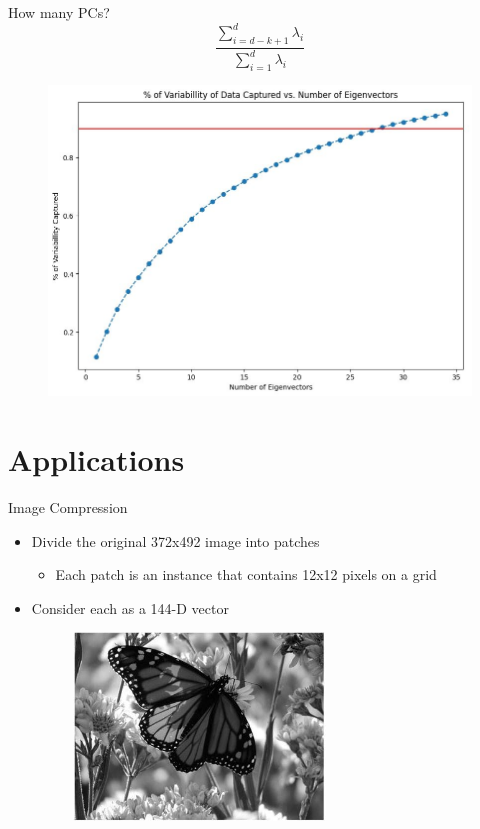 \documentclass[serif, aspectratio=169]{beamer}
\begin{document}
\begin{frame}{How many PCs?}
       $$\frac{\sum_{i=d-k+1}^{d} \lambda_i}{\sum_{i=1}^{d} \lambda_i}$$
       \begin{figure}[htpb]
            \begin{center}
                \includegraphics[keepaspectratio, scale=0.4]{pic/PCA_var.JPG}
            \end{center}
        \end{figure}
\end{frame}

\section{Applications}

\begin{frame}{Image Compression}
       \begin{itemize}
           \item Divide the original 372x492 image into patches
\begin{itemize}
    \item Each patch is an instance that contains 12x12 pixels on a grid
\end{itemize}
            \item Consider each as a 144-D vector
       \end{itemize}
        \begin{figure}[htpb]
            \begin{center}
                \includegraphics[width=8cm, height=5cm]{pic/original.JPG}
            \end{center}
        \end{figure}
\end{frame}
\end{document}
